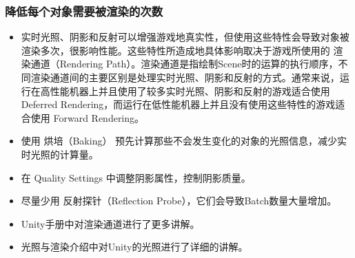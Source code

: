 \documentclass[9pt, b5paper]{article}
\begin{document}
\subsubsection{降低每个对象需要被渲染的次数}
\label{sec-6-3-4}
\begin{itemize}
\item 实时光照、阴影和反射可以增强游戏地真实性，但使用这些特性会导致对象被渲染多次，很影响性能。这些特性所造成地具体影响取决于游戏所使用的 渲染通道（Rendering Path）。渲染通道是指绘制Scene时的运算的执行顺序，不同渲染通道间的主要区别是处理实时光照、阴影和反射的方式。通常来说，运行在高性能机器上并且使用了较多实时光照、阴影和反射的游戏适合使用 Deferred Rendering，而运行在低性能机器上并且没有使用这些特性的游戏适合使用 Forward Rendering。
\item 使用 烘培（Baking） 预先计算那些不会发生变化的对象的光照信息，减少实时光照的计算量。
\item 在 Quality Settings 中调整阴影属性，控制阴影质量。
\item 尽量少用 反射探针（Reflection Probe），它们会导致Batch数量大量增加。
\item Unity手册中对渲染通道进行了更多讲解。
\item 光照与渲染介绍中对Unity的光照进行了详细的讲解。
\end{itemize}
\end{document}
